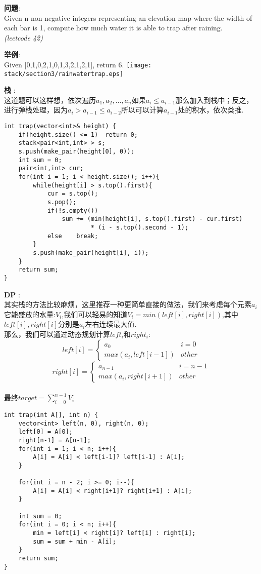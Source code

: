     
\begin{description}
    \item{\textbf{问题}}:\\
Given n non-negative integers representing an elevation map where the width of each bar is 1, compute how much water it is able to trap after raining.\\
\textit{(leetcode 42)}
    \item{\textbf{举例}}:\\
Given [0,1,0,2,1,0,1,3,2,1,2,1], return 6.
\texttt{[image: stack/section3/rainwatertrap.eps]}
    \item{\textbf{栈}} : 
    \\这道题可以这样想，依次遍历$a_1, a_2, ..., a_n$如果$a_i \le a_{i-1}$那么加入到栈中；反之，进行弹栈处理，因为$a_i > a_{i-1} \le a_{i-2}$所以可以计算$a_{i-1}$处的积水，依次类推.
    \begin{lstlisting}
int trap(vector<int>& height) {
	if(height.size() <= 1)	return 0;
	stack<pair<int,int> > s;
	s.push(make_pair(height[0], 0));
	int sum = 0;
	pair<int,int> cur;
	for(int i = 1; i < height.size(); i++){
		while(height[i] > s.top().first){
			cur = s.top();
			s.pop();
			if(!s.empty())	
				sum += (min(height[i], s.top().first) - cur.first) 
						* (i - s.top().second - 1);
			else	break;
		}
		s.push(make_pair(height[i], i));
	}
	return sum;
}
    \end{lstlisting}
    \item{\textbf{DP}} : 
    \\其实栈的方法比较麻烦，这里推荐一种更简单直接的做法，我们来考虑每个元素$a_i$它能盛放的水量:$V_i$,我们可以轻易的知道$V_i = min(left[i], right[i])$,其中$left[i],right[i]$分别是$a_i$左右连续最大值.
	\\那么，我们可以通过动态规划计算$left_i和right_i$:
$$
left[i] =
\begin{cases} 
a_0 & i = 0 \\
max(a_i, left[i-1]) & other
\end{cases}
$$
$$
right[i] =
\begin{cases} 
a_{n-1} & i = n-1 \\
max(a_i, right[i+1]) & other
\end{cases}
$$
	\\最终$target = \sum_{i=0}^{n-1}V_i$
    \begin{lstlisting}
int trap(int A[], int n) {
	vector<int> left(n, 0), right(n, 0);
	left[0] = A[0];
	right[n-1] = A[n-1];
	for(int i = 1; i < n; i++){
		A[i] = A[i] < left[i-1]? left[i-1] : A[i];
	}

	for(int i = n - 2; i >= 0; i--){
		A[i] = A[i] < right[i+1]? right[i+1] : A[i];
	}

	int sum = 0;
	for(int i = 0; i < n; i++){
		min = left[i] < right[i]? left[i] : right[i];
		sum = sum + min - A[i];
	}
	return sum;
}
    \end{lstlisting}
\end{description}
